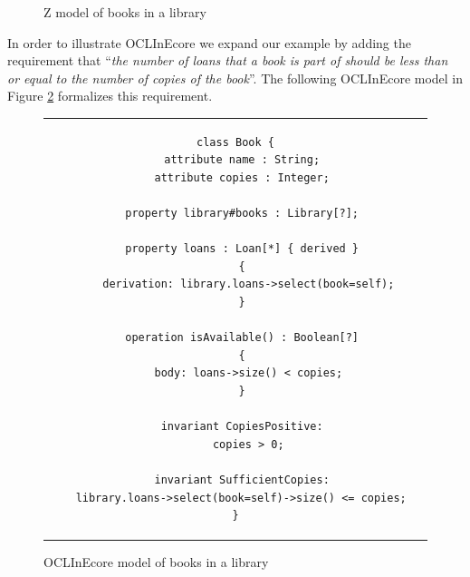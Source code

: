 \begin{figure}
\caption{Z model of books in a library}
\label{fig:book-z}
\end{figure}

%   

In order to illustrate OCLInEcore we expand our example by adding 
the requirement that ``{\em the number of loans that a book is part 
of should be less than or equal to the 
number of copies of the book}''. The following OCLInEcore model 
in Figure \ref{fig:book-oclinecore} formalizes this requirement.

\begin{figure}
\begin{center}
\begin{tabular}{c}
\begin{lstlisting}[language=oclinecore]
class Book {
  attribute name : String;
  attribute copies : Integer;

  property library#books : Library[?];
     
  property loans : Loan[*] { derived }
  {
    derivation: library.loans->select(book=self);
  }

  operation isAvailable() : Boolean[?]
  {
    body: loans->size() < copies;
  }
     
  invariant CopiesPositive:
    copies > 0;
     
  invariant SufficientCopies:
    library.loans->select(book=self)->size() <= copies;     
}
\end{lstlisting}
\end{tabular}
\end{center}
\caption{OCLInEcore model of books in a library}
\label{fig:book-oclinecore}
\end{figure}

